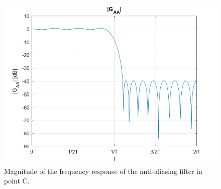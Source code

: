 \documentclass[a4paper,11.5pt]{article}
\begin{document}
\begin{figure}[H]
	\begin{center}   
		\includegraphics[width=\textwidth]{figs/GAA.png} 
		\caption{Magnitude of the frequency response of the anti-aliasing filter in point C.}
		\label{fig:C_gaa}
	\end{center}
\end{figure}
\end{document}
